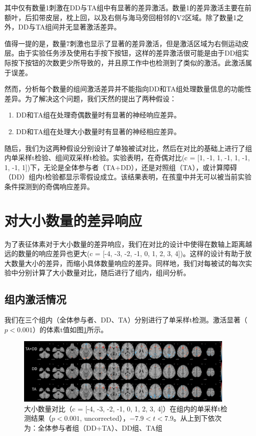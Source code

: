 \documentclass[bachelor, comfort]{shtthesis}
\begin{document}
其中仅有数量1刺激在DD与TA组中有显著的差异激活。数量1的差异激活主要在前额叶，后扣带皮层，枕上回，以及右侧与海马旁回相邻的V2区域。除了数量1之外，DD与TA组间并无显著激活差异。

值得一提的是，数量7刺激也显示了显著的差异激活，但是激活区域为右侧运动皮层。由于实验任务涉及使用右手按下按钮，这样的差异激活很可能是由于DD组实际按下按钮的次数更少所导致的，并且原工作中也检测到了类似的激活。此激活属于误差。

然而，分析每个数量的组间激活差异并不能指向DD和TA组处理数量信息的功能性差异。为了解决这个问题，我们天然的提出了两种假设：

\begin{enumerate}
	\item DD和TA组在处理奇偶数量时有显著的神经响应差异。
	\item DD和TA组在处理大小数量时有显著的神经相应差异。
\end{enumerate}

随后，我们为这两种假设分别设计了单独被试对比，然后在对比的基础上进行了组内单采样t检验、组间双采样t检验。实验表明，在奇偶对比(c = [1, -1, 1, -1, 1, -1, 1, -1, 1])下，无论是全体参与者（TA+DD），还是对照组（TA），或计算障碍（DD）组内t检验都显示零假设成立。该结果表明，在孩童中并无可以被当前实验条件探测到的奇偶响应差异。

\section{对大小数量的差异响应}
为了表征体素对于大小数量的差异响应，我们在对比的设计中使得在数轴上距离越远的数量的响应差异也更大(c = [-4, -3, -2, -1, 0, 1, 2, 3, 4])。这样的设计有助于放大数量大小的差异，而缩小具体数量响应的差异。同样地，我们对每被试的每次实验中分别计算了大小数量对比，随后进行了组内，组间分析。

\subsection{组内激活情况}
我们在三个组内（全体参与者、DD、TA）分别进行了单采样t检测。激活显著（$p<0.001$）的体素t值如图\ref{fig:big_small_contrast}所示。

\begin{figure}[h]
	\centering
	\includegraphics[width=0.95\textwidth]{figures/3_big_small_contrast.png}
	\caption{\label{fig:big_small_contrast} 大小数量对比（c = [-4, -3, -2, -1, 0, 1, 2, 3, 4]）在组内的单采样t检测结果（$p<0.001$, uncorrected），$-7.9<t<7.9$。从上到下依次为：全体参与者组（DD+TA）、DD组、TA组}
\end{figure}
\end{document}
